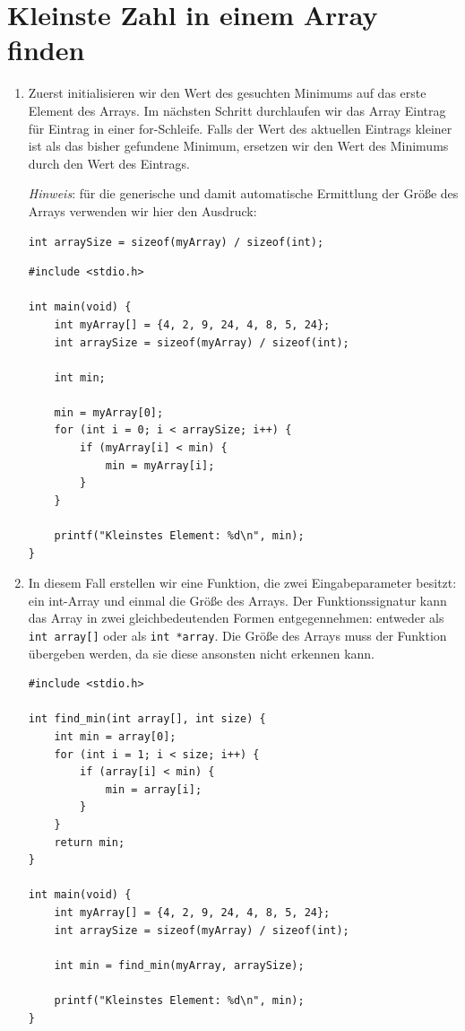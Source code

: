 \chapter{Kleinste Zahl in einem Array finden}

\begin{enumerate}
  \item Zuerst initialisieren wir den Wert des gesuchten Minimums auf das erste
  Element des Arrays. Im nächsten Schritt durchlaufen wir das Array Eintrag für
  Eintrag in einer for-Schleife. Falls der Wert des aktuellen Eintrags kleiner
  ist als das bisher gefundene Minimum, ersetzen wir den Wert des Minimums
  durch den Wert des Eintrags.

  \textit{Hinweis}: für die generische und damit automatische Ermittlung der
  Größe des Arrays verwenden wir hier den Ausdruck:

\noindent\texttt{int arraySize = sizeof(myArray) / sizeof(int);}

\begin{verbatim}
#include <stdio.h>

int main(void) {
    int myArray[] = {4, 2, 9, 24, 4, 8, 5, 24};
    int arraySize = sizeof(myArray) / sizeof(int);

    int min;

    min = myArray[0];
    for (int i = 0; i < arraySize; i++) {
        if (myArray[i] < min) {
            min = myArray[i];
        }
    }

    printf("Kleinstes Element: %d\n", min);
}
\end{verbatim}

  \item In diesem Fall erstellen wir eine Funktion, die zwei Eingabeparameter
  besitzt: ein int-Array und einmal die Größe des Arrays. Der Funktionssignatur
  kann das Array in zwei gleichbedeutenden Formen entgegennehmen: entweder als
  \texttt{int array[]} oder als \texttt{int *array}. Die Größe
  des Arrays muss der Funktion übergeben werden, da sie diese ansonsten nicht
  erkennen kann.

\begin{verbatim}
#include <stdio.h>

int find_min(int array[], int size) {
    int min = array[0];
    for (int i = 1; i < size; i++) {
        if (array[i] < min) {
            min = array[i];
        }
    }
    return min;
}

int main(void) {
    int myArray[] = {4, 2, 9, 24, 4, 8, 5, 24};
    int arraySize = sizeof(myArray) / sizeof(int);

    int min = find_min(myArray, arraySize);

    printf("Kleinstes Element: %d\n", min);
}
\end{verbatim}

\end{enumerate}



